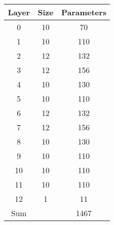 \begin{tabular}{|c|c|c|}
\hline
Layer&Size&Parameters\\ 
\hline

0 & 10 & 70\\ 
\hline
1 & 10 & 110\\ 
\hline
2 & 12 & 132\\ 
\hline
3 & 12 & 156\\ 
\hline
4 & 10 & 130\\ 
\hline
5 & 10 & 110\\ 
\hline
6 & 12 & 132\\ 
\hline
7 & 12 & 156\\ 
\hline
8 & 10 & 130\\ 
\hline
9 & 10 & 110\\ 
\hline
10 & 10 & 110\\ 
\hline
11 & 10 & 110\\ 
\hline
12 & 1 & 11\\ 
\hline
Sum &  & 1467\\ 
\hline
\end{tabular}

